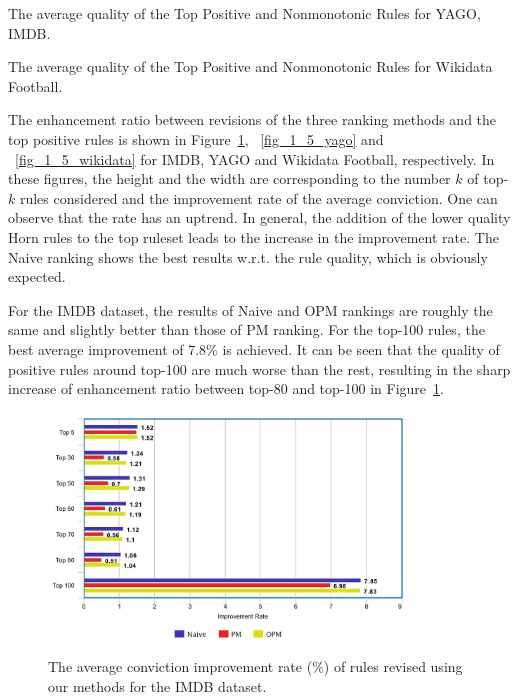 \begin{table}[ht]
\centering
\footnotesize
\renewcommand*{\arraystretch}{1.07}
\centering

\smallskip
\caption{The average quality of the Top Positive and Nonmonotonic Rules for YAGO, IMDB.}
\label{tab:rules_quality1}
\end{table}

\begin{table}[ht]
\centering
\footnotesize
\renewcommand*{\arraystretch}{1.07}
\centering

\smallskip
\caption{The average quality of the Top Positive and Nonmonotonic Rules for Wikidata Football.}
\label{tab:rules_quality2}
\end{table}

The enhancement ratio between revisions of the three ranking methods and the top positive rules is shown in Figure~\ref{fig_1_5_imdb}, ~\ref{fig_1_5_yago} and ~\ref{fig_1_5_wikidata} for IMDB, YAGO and Wikidata Football, respectively. In these figures, the height and the width are corresponding to the number $k$ of top-$k$ rules considered and the improvement rate of the average conviction. One can observe that the rate has an uptrend. In general, the addition of the lower quality Horn rules to the top ruleset leads to the increase in the improvement rate. The Naive ranking shows the best results w.r.t. the rule quality, which is obviously expected.

For the IMDB dataset, the results of Naive and OPM rankings are roughly the same and slightly better than those of PM ranking. For the top-100 rules, the best average improvement of 7.8\% is achieved. It can be seen that the quality of positive rules around top-100 are much worse than the rest, resulting in the sharp increase of enhancement ratio between top-80 and top-100 in Figure~\ref{fig_1_5_imdb}.

\begin{figure}[ht]
\centering
\includegraphics[width=0.85\textwidth]{figures/table_1_5_imdb.jpeg}
\caption{The average conviction improvement rate (\%) of rules revised using our methods for the IMDB dataset.}
\label{fig_1_5_imdb}
\end{figure}

